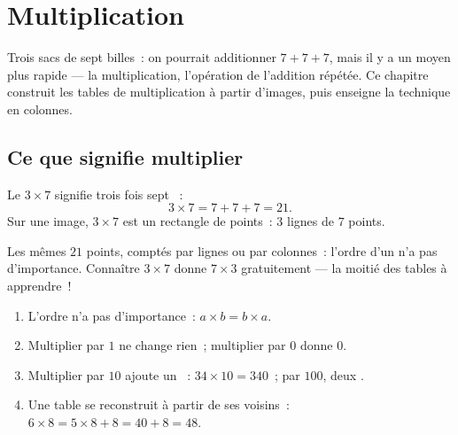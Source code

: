\chapter{Multiplication}\label{ch:g3:mult}

Trois sacs de sept billes~: on pourrait additionner $7 + 7 + 7$, mais
il y a un moyen plus rapide --- la multiplication, l'opération de
l'addition répétée. Ce chapitre construit les tables de
multiplication à partir d'images, puis enseigne la technique en
colonnes.

\section{Ce que signifie multiplier}

\begin{definition}[Multiplication]\label{def:g3:mult:def}
Le  $3 \times 7$ signifie \guillemotleft{} trois fois sept
\guillemotright{}~:
\[
3 \times 7 = 7 + 7 + 7 = 21 .
\]
Sur une image, $3 \times 7$ est un rectangle de points~: $3$ lignes
de $7$ points.
\end{definition}

\begin{omfigure}

{\small Les mêmes $21$ points, comptés par lignes ou par
colonnes~: l'ordre d'un  n'a pas d'importance. Connaître
$3 \times 7$ donne $7 \times 3$ gratuitement --- la moitié des
tables à apprendre~!}
\end{omfigure}

\begin{proposition}[Règles utiles]\label{prop:g3:mult:rules}
\begin{enumerate}
  \item L'ordre n'a pas d'importance~: $a \times b = b \times a$.
  \item Multiplier par $1$ ne change rien~; multiplier par $0$ donne
        $0$.
  \item Multiplier par $10$ ajoute un ~: $34 \times 10 = 340$~;
        par $100$, deux .
  \item Une table se reconstruit à partir de ses voisins~:
        $6 \times 8 = 5 \times 8 + 8 = 40 + 8 = 48$.
\end{enumerate}
\end{proposition}
\admitted

